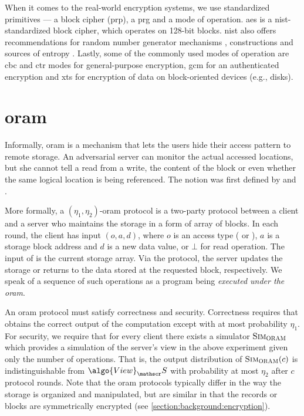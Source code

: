 			When it comes to the real-world encryption systems, we use standardized primitives --- a block cipher (\acrshort{prp}), a \acrlong{prg} and a mode of operation.
			\acrfull{aes} \cite{aes-nist} is a \acrshort{nist}-standardized block cipher, which operates on 128-bit blocks.
			\acrshort{nist} also offers recommendations for random number generator mechanisms \cite{nist-prg-mechanism}, constructions \cite{nist-prg-constructions} and sources of entropy \cite{nist-prg-entropy}.
			Lastly, some of the commonly used modes of operation are \acrshort{cbc} and \acrshort{ctr} \cite{nist-modes} modes for general-purpose encryption, \acrshort{gcm} \cite{nist-gcm} for an authenticated encryption and \acrshort{xts} \cite{ieee-xts} for encryption of data on block-oriented devices (e.g., disks).

	\section{\texorpdfstring{\acrlong{oram}}{Oblivious Random Access Machine}}\label{section:background:oram}

		Informally, \acrfull{oram} is a mechanism that lets the users hide their access pattern to remote storage.
		An adversarial server can monitor the actual accessed locations, but she cannot tell a read from a write, the content of the block or even whether the same logical location is being referenced.
		The notion was first defined by \textcite{oram-theory} and \textcite{oram-original}.

		More formally, a $(\eta_1, \eta_2)$-\acrshort{oram} protocol is a two-party protocol between a client \client{} and a server \server{} who maintains the storage in a form of array of blocks.
		In each round, the client \client{} has input $(o, a, d)$, where $o$ is an access type (\oramRead{} or \oramWrite{}), $a$ is a storage block address and $d$ is a new data value, or $\bot$ for read operation.
		The input of \server{} is the current storage array.
		Via the protocol, the server updates the storage or returns to \user{} the data stored at the requested block, respectively.
		We speak of a sequence of such operations as a program \oramProgram{} being \emph{executed under the \acrshort{oram}}.

		An \acrshort{oram} protocol must satisfy correctness and security.
		Correctness requires that \client{} obtains the correct output of the computation except with at most probability $\eta_1$.
		For security, we require that for every client \client{} there exists a simulator $\textsc{Sim}_{\textsc{ORAM}}$ which provides a simulation of the server's view in the above experiment given only the number of operations.
		That is, the output distribution of $\textsc{Sim}_{\textsc{ORAM}} (c)$ is indistinguishable from $\algo{View}_\server$ with probability at most $\eta_2$ after $c$ protocol rounds.
		Note that the \acrshort{oram} protocols typically differ in the way the storage is organized and manipulated, but are similar in that the records or blocks are symmetrically encrypted (see \cref{section:background:encryption}).

